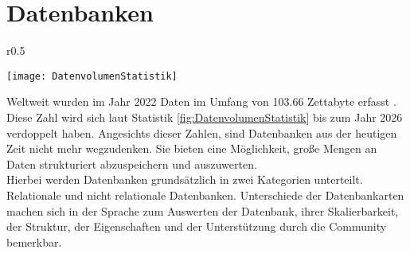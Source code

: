 \section{Datenbanken}\label{sec:Datenbank}
\begin{wrapfigure}{r}{0.5\textwidth}
    \vspace{-1.2cm}
    \captionsetup{justification=centering,format=plain, font=small}
    \begin{center}
      \texttt{[image: DatenvolumenStatistik]}
    \end{center}
    \vspace{-0.5cm}
    \caption{Volumen der weltweit generierten Daten bis 2027 \cite{Datenmengen}}
    \label{fig:DatenvolumenStatistik}
    \vspace{-0.5cm}
  \end{wrapfigure}
Weltweit wurden im Jahr 2022 Daten im Umfang von 103.66 Zettabyte erfasst \cite{Datenmengen}. Diese Zahl wird sich laut Statistik \ref{fig:DatenvolumenStatistik} bis zum Jahr 2026 verdoppelt haben. Angesichts dieser Zahlen, sind Datenbanken aus der heutigen Zeit nicht mehr wegzudenken. Sie bieten eine Möglichkeit, große Mengen an Daten strukturiert abzuspeichern und auszuwerten.\\
Hierbei werden Datenbanken grundsätzlich in zwei Kategorien unterteilt. Relationale und nicht relationale Datenbanken. Unterschiede der Datenbankarten machen sich in der Sprache zum Auswerten der Datenbank, ihrer Skalierbarkeit, der Struktur, der Eigenschaften und der Unterstützung durch die Community bemerkbar. \cite{SQLNoSQL} 

